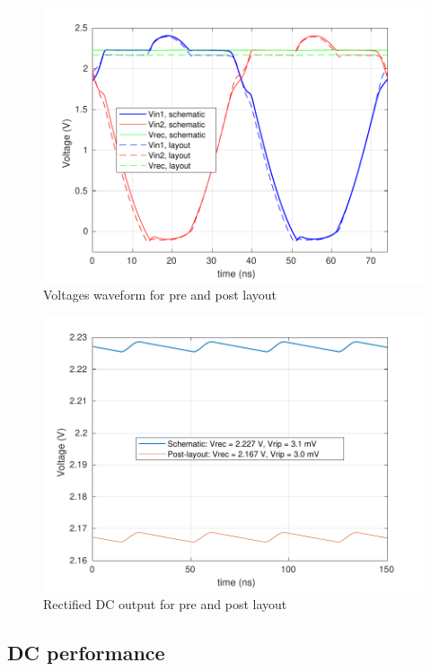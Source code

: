 \documentclass[12pt,a4paper,UKenglish]{article}
\begin{document}
\begin{figure}[H] %
   \centering
   \includegraphics[width=\textwidth]{img/rectifier_V_post.pdf} 
   \caption{Voltages waveform for pre and post layout}
   \label{fig:rect_v_post}
\end{figure}

\begin{figure}[H] %
   \centering
   \includegraphics[width=\textwidth]{img/rectifier_ripple.pdf} 
   \caption{Rectified DC output for pre and post layout}
   \label{fig:rect_ripple}
\end{figure}

\subsection{DC performance}
\end{document}
